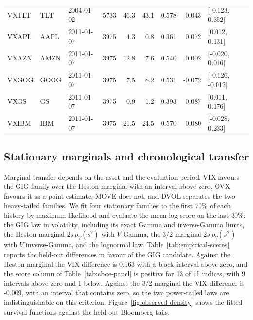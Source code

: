 {\begin{longtable}{@{}l P{22mm} l r r r r r l@{}}
VXTLT & TLT & 2004-01-02 & 5733 & 46.3 & 43.1 & 0.578 & 0.043 & [-0.123, 0.352] \\

VXAPL & AAPL & 2011-01-07 & 3975 & 4.3 & 0.8 & 0.361 & 0.072 & [0.012, 0.131] \\

VXAZN & AMZN & 2011-01-07 & 3975 & 12.8 & 7.6 & 0.540 & -0.002 & [-0.020, 0.016] \\

VXGOG & GOOG & 2011-01-07 & 3975 & 7.5 & 8.2 & 0.531 & -0.072 & [-0.126, -0.012] \\

VXGS & GS & 2011-01-07 & 3975 & 0.9 & 1.2 & 0.393 & 0.087 & [0.011, 0.176] \\

VXIBM & IBM & 2011-01-07 & 3975 & 21.5 & 24.5 & 0.570 & 0.080 & [-0.028, 0.233] \\

\bottomrule\end{longtable}}

\subsection{Stationary marginals and chronological transfer}
\label{sec:empirical-density}
Marginal transfer depends on the asset and the evaluation period. VIX favours the
GIG family over the Heston marginal with an interval above zero, OVX favours it as
a point estimate, MOVE does not, and DVOL separates the two heavy-tailed families.
We fit four stationary
families to the first 70\% of each history by maximum likelihood and evaluate the
mean log score on the last 30\%: the GIG law in volatility, including its exact
Gamma and inverse-Gamma limits, the Heston marginal $2s\,p_V(s^2)$ with $V$ Gamma,
the 3/2 marginal $2s\,p_V(s^2)$ with $V$ inverse-Gamma, and the lognormal law.
Table~\ref{tab:empirical-scores} reports the held-out differences in favour of the
GIG candidate. Against the Heston marginal the VIX difference is 0.163 with
a block interval above zero, and the score column of Table~\ref{tab:cboe-panel}
is positive for 13 of 15 indices, with 9 intervals above zero and 1 below. Against the 3/2 marginal the VIX difference is -0.009, with an
interval that contains zero, so the two power-tailed laws are indistinguishable on
this criterion. Figure~\ref{fig:observed-density} shows the fitted survival
functions against the held-out Bloomberg tails.

